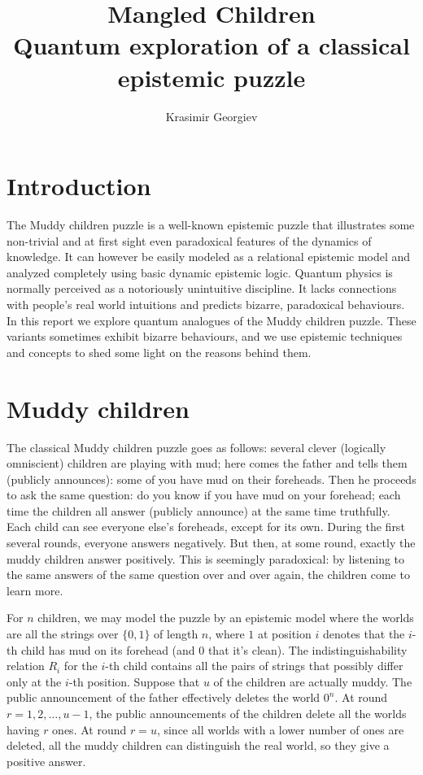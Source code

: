 \documentclass[a4paper]{article}
\title{Mangled Children \\ \large Quantum exploration of a classical epistemic
 puzzle}
\author{Krasimir Georgiev}
\begin{document}
\maketitle
\section*{Introduction} The Muddy children puzzle is a well-known epistemic
puzzle that illustrates some non-trivial and at first sight even paradoxical
features of the dynamics of knowledge. It can however be easily modeled as a
relational epistemic model and analyzed completely using basic dynamic epistemic
logic. Quantum physics is normally perceived as a notoriously unintuitive
discipline. It lacks connections with people's real world intuitions and
predicts bizarre, paradoxical behaviours. In this report we explore quantum
analogues of the Muddy children puzzle. These variants sometimes exhibit bizarre
behaviours, and we use epistemic techniques and concepts to shed some light on
the reasons behind them.

\section*{Muddy children} The classical Muddy children puzzle goes as follows:
several clever (logically omniscient) children are playing with mud; here comes
the father and tells them (publicly announces): some of you have mud on their
foreheads. Then he proceeds to ask the same question: do you know if you have
mud on your forehead; each time the children all answer (publicly announce) at
the same time truthfully. Each child can see everyone else's foreheads, except
for its own. During the first several rounds, everyone answers negatively. But
then, at some round, exactly the muddy children answer positively. This is
seemingly paradoxical: by listening to the same answers of the same question
over and over again, the children come to learn more.

For $n$ children, we may model the puzzle by an epistemic model where the worlds
are all the strings over $\{0, 1\}$ of length $n$, where $1$ at position $i$
denotes that the $i$-th child has mud on its forehead (and $0$ that it's clean).
The indistinguishability relation $R_i$ for the $i$-th child contains all the
pairs of strings that possibly differ only at the $i$-th position.
Suppose that $u$ of the children are actually muddy. The public announcement of
the father effectively deletes the world $0^n$. At round $r = 1, 2, \dots, u-1$,
the public announcements of the children delete all the worlds having $r$ ones.
At round $r = u$, since all worlds with a lower number of ones are deleted, all
the muddy children can distinguish the real world, so they give a positive
answer.
\end{document}
